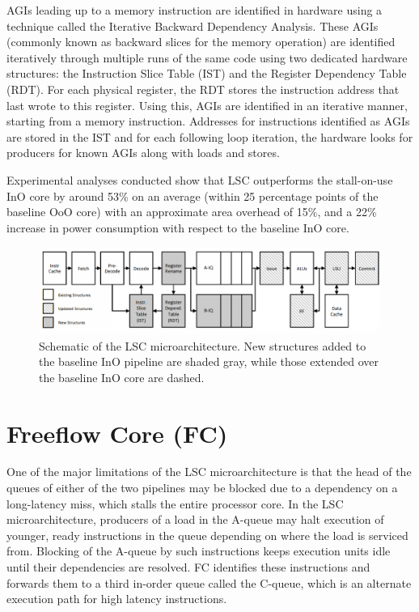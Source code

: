 \documentclass[a4paper,12pt, final]{report}
\begin{document}
AGIs leading up to a memory instruction are identified in hardware using a technique called the Iterative Backward Dependency Analysis. These AGIs (commonly known as backward slices for the memory operation) are identified iteratively through multiple runs of the same code using two dedicated hardware structures: the Instruction Slice Table (IST) and the Register Dependency Table (RDT). For each physical register, the RDT stores the instruction address that last wrote to this register. Using this, AGIs are identified in an iterative manner, starting from a memory instruction. Addresses for instructions identified as AGIs are stored in the IST and for each following loop iteration, the hardware looks for producers for known AGIs along with loads and stores.

Experimental analyses conducted show that LSC outperforms the stall-on-use InO core by around 53\% on an average (within 25 percentage points of the baseline OoO core) with an approximate area overhead of 15\%, and a 22\% increase in power consumption with respect to the baseline InO core.

\begin{figure}[H]
    \begin{center}
    \includegraphics[width=\linewidth]{august22/img/lsc.png}
    \caption{Schematic of the LSC microarchitecture. New structures added to the baseline InO pipeline are shaded gray, while those extended over the baseline InO core are dashed.}
    \end{center}
\end{figure}

\section{Freeflow Core (FC)}

One of the major limitations of the LSC microarchitecture is that the head of the queues of either of the two pipelines may be blocked due to a dependency on a long-latency miss, which stalls the entire processor core. In the LSC microarchitecture, producers of a load in the A-queue may halt execution of younger, ready instructions in the queue depending on where the load is serviced from. Blocking of the A-queue by such instructions keeps execution units idle until their dependencies are resolved. FC identifies these instructions and forwards them to a third in-order queue called the C-queue, which is an alternate execution path for high latency instructions.
\end{document}
